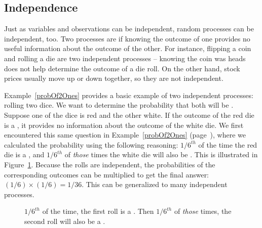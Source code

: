 \subsection{Independence}
\label{probabilityIndependence}

Just as variables and observations can be independent, random processes can be independent, too. Two processes are  if knowing the outcome of one provides no useful information about the outcome of the other. For instance, flipping a coin and rolling a die are two independent processes -- knowing the coin was heads does not help determine the outcome of a die roll. On the other hand, stock prices usually move up or down together, so they are not independent.

Example~\ref{probOf2Ones} provides a basic example of two independent processes: rolling two dice. We want to determine the probability that both will be . Suppose one of the dice is red and the other white. If the outcome of the red die is a , it provides no information about the outcome of the white die. We first encountered this same question in Example~\ref{probOf2Ones} (page~\pageref{probOf2Ones}), where we calculated the probability using the following reasoning: $1/6^{th}$ of the time the red die is a , and $1/6^{th}$ of \emph{those} times the white die will also be . This is illustrated in Figure~\ref{indepForRollingTwo1s}. Because the rolls are independent, the probabilities of the corresponding outcomes can be multiplied to get the final answer: $(1/6)\times(1/6)=1/36$. This can be generalized to many independent processes.

\begin{figure}[hht]
\centering
{}
\caption{$1/6^{th}$ of the time, the first roll is a . Then $1/6^{th}$ of \emph{those} times, the second roll will also be a .}
\label{indepForRollingTwo1s}
\end{figure}

\D{\newpage}

